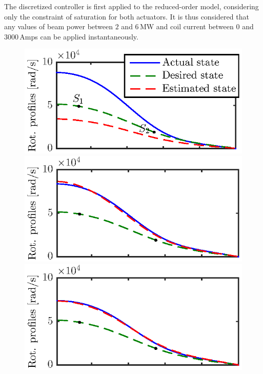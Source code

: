 \documentclass{iopart}
\begin{document}
The discretized controller is first applied to the reduced-order model, considering only the constraint of saturation for both actuators. It is thus considered that any values of beam power between $2$ and $6$\,MW and coil current between $0$ and $3000$\,Amps can be applied instantaneously.   

\begin{figure}
	\centering
	\includegraphics{imene_figs/fig13a} \\[-0.3em] %
	\includegraphics{imene_figs/fig13b} \\[-0.3em] %
	\includegraphics{imene_figs/fig13c} \\[-0.3em] %

\end{figure}
\end{document}
